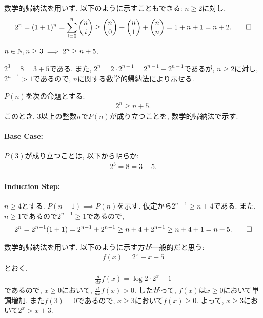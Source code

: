 \begin{rem}
  数学的帰納法を用いず, 以下のように示すこともできる:
  $n\geq 2$に対し,
  \begin{align*}
    2^n=(1+1)^n=\sum_{i=0}^n \binom{n}{i}\geq \binom{n}{0}+\binom{n}{1}+\binom{n}{n}=1+n+1=n+2
    .\qedhere
  \end{align*}
\end{rem}

\begin{prop}
  \label{p:20230810}
  $n\in\mathbb{N}, n\geq 3 \implies 2^n\geq n+5$.
\end{prop}
\begin{proof**}
  $2^3=8=3+5$である.
  また,
  $2^n=2\cdot 2^{n-1}=2^{n-1}+2^{n-1}$であるが,
  $n\geq 2$に対し,
  $2^{n-1} > 1$であるので,
  $n$に関する数学的帰納法により示せる.
\end{proof**}
\begin{proof*}
  $P(n)$を次の命題とする:
  \begin{align*}
    2^n\geq n+5
    .
  \end{align*}
  このとき,
  $3$以上の整数$n$で$P(n)$が成り立つことを,
  数学的帰納法で示す.

  \paragraph{Base Case:}
  $P(3)$が成り立つことは, 以下から明らか:
  \begin{align*}
    2^3=8=3+5.
  \end{align*}
  \paragraph{Induction Step:}
  $n\geq 4$とする.
  $P(n-1)\implies P(n)$を示す.
  仮定から$2^{n-1}\geq n+4$である.
  また, $n\geq 1$であるので$2^{n-1}\geq 1$であるので,
  \begin{align*}
    2^n=2^{n-1}(1+1)=2^{n-1}+2^{n-1}\geq n+4+2^{n-1}\geq n+4+1=n+5
    .\qedhere
  \end{align*}
\end{proof*}

\begin{rem}
  数学的帰納法を用いず, 以下のように示す方が一般的だと思う:
  \begin{align*}
    f(x)=2^x-x-5
  \end{align*}
  とおく.
  \begin{align*}
    \frac{d}{dx}f(x)=\log 2 \cdot 2^x-1
  \end{align*}
  であるので, $x\geq 0$において, $\frac{d}{dx}f(x)> 0$.
  したがって, $f(x)$は$x\geq 0$において単調増加.
  また$f(3)=0$であるので,
  $x\geq 3$において$f(x)\geq 0$.
  よって, $x\geq 3$において$2^x>x+3$.
\end{rem}

